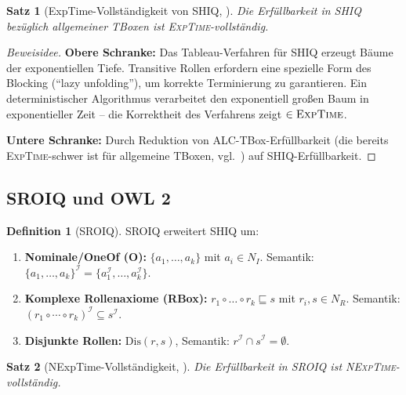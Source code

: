 ﻿\documentclass[a4paper,12pt]{article}
\theoremstyle{definition}
\newtheorem{definition}{Definition}[section]
\theoremstyle{plain}
\newtheorem{satz}{Satz}[section]
\theoremstyle{remark}
\newcommand{\interp}[1]{\ensuremath{\mathcal{#1}}}
\begin{document}
\begin{satz}[ExpTime-Vollst{\"{a}}ndigkeit von SHIQ, \cite{Horrocks2000}]
Die Erf{\"{u}}llbarkeit in \textsf{SHIQ} bez{\"{u}}glich allgemeiner TBoxen ist
\textsc{ExpTime}-vollst{\"{a}}ndig.
\end{satz}

\begin{proof}[Beweisidee]
\textbf{Obere Schranke:}
Das Tableau-Verfahren f{\"{u}}r \textsf{SHIQ} erzeugt B{\"{a}}ume der
exponentiellen Tiefe. Transitive Rollen erfordern eine
spezielle Form des Blocking (``lazy unfolding''),
um korrekte Terminierung zu garantieren.
Ein deterministischer Algorithmus verarbeitet den exponentiell
gro{\ss}en Baum in exponentieller Zeit -- die Korrektheit des
Verfahrens zeigt $\in \textsc{ExpTime}$.

\textbf{Untere Schranke:}
Durch Reduktion von \textsc{ALC}-TBox-Erf{\"{u}}llbarkeit
(die bereits \textsc{ExpTime}-schwer ist f{\"{u}}r allgemeine TBoxen,
vgl.~\cite{Baader2007})
auf \textsf{SHIQ}-Erf{\"{u}}llbarkeit.
\end{proof}

\subsection{SROIQ und OWL 2}

\begin{definition}[SROIQ]
\textsf{SROIQ} erweitert \textsf{SHIQ} um:
\begin{enumerate}[label=(\roman*)]
  \item \textbf{Nominale/OneOf (O):}
        $\{a_1, \ldots, a_k\}$ mit $a_i \in N_I$.
        Semantik: $\{a_1,\ldots,a_k\}^\interp{I} = \{a_1^\interp{I},\ldots,a_k^\interp{I}\}$.
  \item \textbf{Komplexe Rollenaxiome (RBox):}
        $r_1 \circ \ldots \circ r_k \sqsubseteq s$ mit $r_i, s \in N_R$.
        Semantik: $(r_1 \circ \cdots \circ r_k)^\interp{I}
        \subseteq s^\interp{I}$.
  \item \textbf{Disjunkte Rollen:} $\mathrm{Dis}(r,s)$,
        Semantik: $r^\interp{I} \cap s^\interp{I} = \emptyset$.
\end{enumerate}
\end{definition}

\begin{satz}[NExpTime-Vollst{\"{a}}ndigkeit, \cite{Horrocks2006}]
Die Erf{\"{u}}llbarkeit in \textsf{SROIQ} ist \textsc{NExpTime}-vollst{\"{a}}ndig.
\end{satz}
\end{document}
